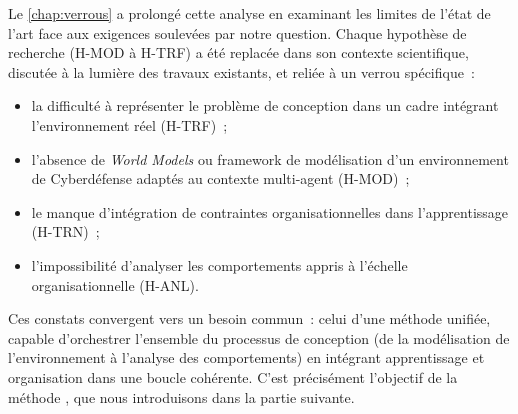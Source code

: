 \noindent
Le \autoref{chap:verrous} a prolongé cette analyse en examinant les limites de l'état de l'art face aux exigences soulevées par notre question. Chaque hypothèse de recherche (H-MOD à H-TRF) a été replacée dans son contexte scientifique, discutée à la lumière des travaux existants, et reliée à un verrou spécifique~:
\begin{itemize}
  \item la difficulté à représenter le problème de conception dans un cadre intégrant l'environnement réel (H-TRF)~;
  \item l'absence de \textit{World Models} ou framework de modélisation d'un environnement de Cyberdéfense adaptés au contexte multi-agent (H-MOD)~;
  \item le manque d'intégration de contraintes organisationnelles dans l'apprentissage (H-TRN)~;
  \item l'impossibilité d'analyser les comportements appris à l'échelle organisationnelle (H-ANL).
\end{itemize}

\medskip

\noindent
Ces constats convergent vers un besoin commun~: celui d'une méthode unifiée, capable d'orchestrer l'ensemble du processus de conception (de la modélisation de l'environnement à l'analyse des comportements) en intégrant apprentissage et organisation dans une boucle cohérente. C'est précisément l'objectif de la méthode , que nous introduisons dans la partie suivante.
